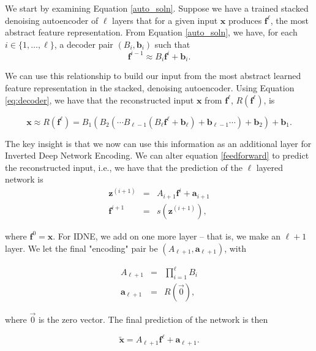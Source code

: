 We start by examining Equation \eqref{auto_soln}. Suppose we have a trained stacked denoising autoencoder  of $\ell$ layers that for a given input $\mathbf{x}$ produces $\mathbf{f}^\ell$, the most abstract feature representation. From Equation \eqref{auto_soln}, we have, for each $i\in\{1,\ldots,\ell\}$, a decoder pair $(B_i, \mathbf{b}_i)$ such that 
\begin{equation}
\label{eq:decoder}
\mathbf{f}^{i-1} \approx B_i \mathbf{f}^{i} + \mathbf{b}_i.
\end{equation}

We can use this relationship to build our input from the most abstract learned feature representation in the stacked, denoising autoencoder. Using Equation \eqref{eq:decoder}, we have that the reconstructed input $\mathbf{x}$ from $\mathbf{f}^\ell$, $R(\mathbf{f}^\ell)$, is

\begin{equation}
\mathbf{x}\approx R( \mathbf{f}^{\ell})  = B_1 (B_2 (\cdots B_{\ell-1}(B_\ell \mathbf{f}^{\ell} + \mathbf{b}_\ell) + \mathbf{b}_{\ell - 1} \cdots ) + \mathbf{b}_2) + \mathbf{b}_1.
\end{equation} 

The key insight is that we now can use this information as an additional layer for Inverted Deep Network Encoding. We can alter equation \eqref{feedforward} to predict the reconstructed input, i.e., we have that the prediction of the $\ell$ layered network is 
\begin{eqnarray}
\label{feedingforward}
\mathbf{z}^{(i+1)} &=& A_{i+1} \mathbf{f}^{i} + \mathbf{a}_{i+1}\\
\mathbf{f}^{i+1} &=& s(\mathbf{z}^{(i+1)}),
\end{eqnarray}

where $\mathbf{f}^0 = \mathbf{x}$. For IDNE, we add on one more layer -- that is, we make an $\ell + 1$ layer. We let the final "encoding" pair be $(A_{\ell+1}, \mathbf{a}_{\ell+1})$, with

\begin{eqnarray}
A_{\ell+1} &=& \prod_{i=1}^{\ell} B_i \\ 
\mathbf{a}_{\ell+1} &=& R(\overrightarrow{0}),
\end{eqnarray}

where $\overrightarrow{0}$ is the zero vector. The final prediction of the network is then

\begin{equation}
\label{fd2}
\tilde{\mathbf{x}} = A_{\ell +1}\mathbf{f}^\ell + \mathbf{a}_{\ell+1}.
\end{equation}

